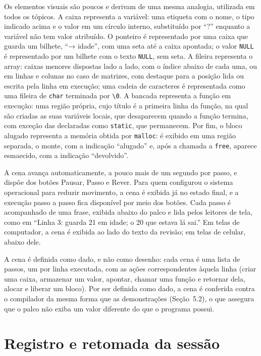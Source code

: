 Os elementos visuais são poucos e derivam de uma mesma analogia, utilizada em todos os tópicos. A caixa representa a variável: uma etiqueta com o nome, o tipo indicado acima e o valor em um círculo interno, substituído por ``?'' enquanto a variável não tem valor atribuído. O ponteiro é representado por uma caixa que guarda um bilhete, ``→ idade'', com uma seta até a caixa apontada; o valor \texttt{NULL} é representado por um bilhete com o texto \texttt{NULL}, sem seta. A fileira representa o array: caixas menores dispostas lado a lado, com o índice abaixo de cada uma, ou em linhas e colunas no caso de matrizes, com destaque para a posição lida ou escrita pela linha em execução; uma cadeia de caracteres é representada como uma fileira de \texttt{char} terminada por \texttt{\textquotesingle{}\textbackslash{}0\textquotesingle{}}. A bancada representa a função em execução: uma região própria, cujo título é a primeira linha da função, na qual são criadas as suas variáveis locais, que desaparecem quando a função termina, com exceção das declaradas como \texttt{static}, que permanecem. Por fim, o bloco alugado representa a memória obtida por \texttt{malloc}: é exibido em uma região separada, o monte, com a indicação ``alugado'' e, após a chamada a \texttt{free}, aparece esmaecido, com a indicação ``devolvido''.

A cena avança automaticamente, a pouco mais de um segundo por passo, e dispõe dos botões Pausar, Passo e Rever. Para quem configurou o sistema operacional para reduzir movimento, a cena é exibida já no estado final, e a execução passo a passo fica disponível por meio dos botões. Cada passo é acompanhado de uma frase, exibida abaixo do palco e lida pelos leitores de tela, como em ``Linha 3: guarda 21 em idade; o 20 que estava lá sai.'' Em telas de computador, a cena é exibida ao lado do texto da revisão; em telas de celular, abaixo dele.

A cena é definida como dado, e não como desenho: cada cena é uma lista de passos, um por linha executada, com as ações correspondentes àquela linha (criar uma caixa, armazenar um valor, apontar, chamar uma função e retornar dela, alocar e liberar um bloco). Por ser definida como dado, a cena é conferida contra o compilador da mesma forma que as demonstrações (Seção~5.2), o que assegura que o palco não exiba um valor diferente do que o programa possui.

\section{Registro e retomada da sessão}

